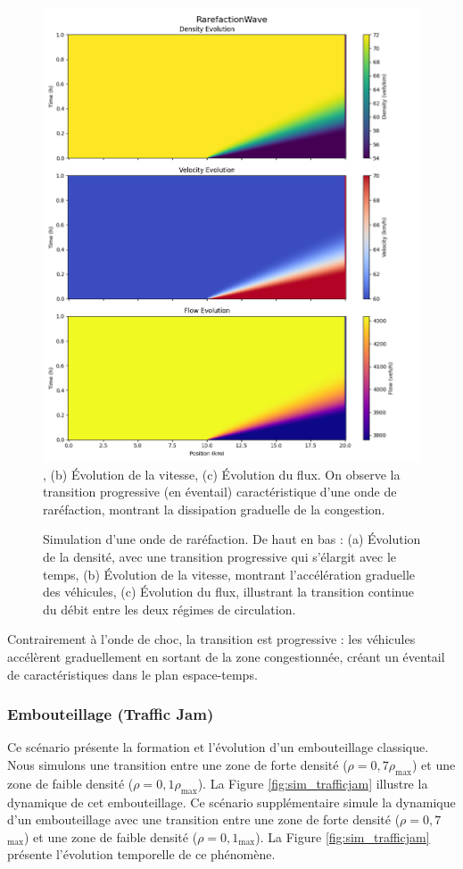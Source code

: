 \begin{figure}[htbp]
\centering
\includegraphics[width=1.0\textwidth]{simulations/LWR/rarefaction/rarefactionwave.png}, (b) Évolution de la vitesse, (c) Évolution du flux. On observe la transition progressive (en éventail) caractéristique d'une onde de raréfaction, montrant la dissipation graduelle de la congestion.
\caption{Simulation d'une onde de raréfaction. De haut en bas : (a) Évolution de la densité, avec une transition progressive qui s'élargit avec le temps, (b) Évolution de la vitesse, montrant l'accélération graduelle des véhicules, (c) Évolution du flux, illustrant la transition continue du débit entre les deux régimes de circulation.}
\label{fig:sim_rarefaction}
\end{figure}

Contrairement à l'onde de choc, la transition est progressive : les véhicules accélèrent graduellement en sortant de la zone congestionnée, créant un éventail de caractéristiques dans le plan espace-temps.

\subsubsection{Embouteillage (Traffic Jam)}
\label{subsubsec:trafficjam_sim}
Ce scénario présente la formation et l'évolution d'un embouteillage classique. Nous simulons une transition entre une zone de forte densité ($\rho = 0,7\rho_{\max}$) et une zone de faible densité ($\rho = 0,1\rho_{\max}$). La Figure \ref{fig:sim_trafficjam} illustre la dynamique de cet embouteillage.
Ce scénario supplémentaire simule la dynamique d'un embouteillage avec une transition entre une zone de forte densité ($\rho = 0,7$\rho$_{\max}$) et une zone de faible densité ($\rho = 0,1$\rho$_{\max}$). La Figure \ref{fig:sim_trafficjam} présente l'évolution temporelle de ce phénomène.

